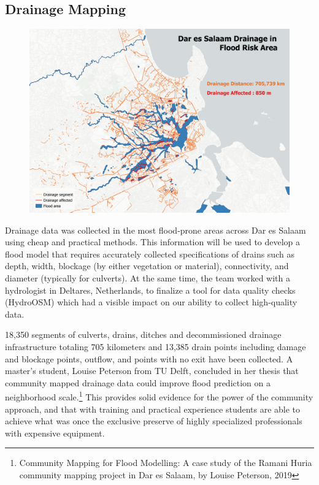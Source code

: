 \documentclass[a4paper,12pt,twoside]{article}
\begin{document}
\newpage
\subsection{Drainage Mapping}
\begin{figure}[h]
    \centering
    \includegraphics[width=.8\textwidth]{images/drainmap_min.png}
    \label{fig:my_label}
\end{figure}
\begin{multicols}{2}
Drainage data was collected in the most flood-prone areas across Dar es Salaam using cheap and practical methods. This information will be used to develop a flood model that requires accurately collected specifications of drains such as depth, width, blockage (by either vegetation or material), connectivity, and diameter (typically for culverts). At the same time, the team worked with a hydrologist in Deltares, Netherlands, to finalize a tool for data quality checks (HydroOSM) which had a visible impact on our ability to collect high-quality data. 

18,350 segments of culverts, drains, ditches and decommissioned drainage infrastructure totaling 705 kilometers and 13,385 drain points including damage and blockage points, outflow, and points with no exit have been collected. A master’s student, Louise Peterson from TU Delft, concluded in her thesis that community mapped drainage data could improve flood prediction on a neighborhood scale.\footnote{ Community Mapping for Flood Modelling: A case study of the Ramani Huria community mapping project in Dar es Salaam, by Louise Peterson, 2019} This provides solid evidence for the power of the community approach, and that with training and practical experience students are able to achieve what was once the exclusive preserve of highly specialized professionals with expensive equipment. 
\end{multicols}
\end{document}
